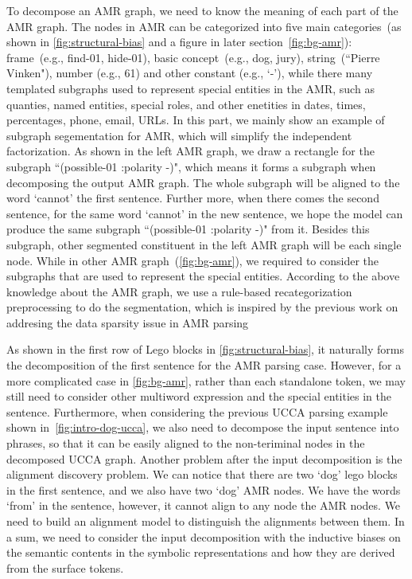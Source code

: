 { To decompose an AMR graph, we need to
know the meaning of each part of the AMR graph. The nodes in AMR can
be categorized into five main categories~(as shown in
\autoref{fig:structural-bias} and a figure in later
section~\autoref{fig:bg-amr}): frame~(e.g., find-01, hide-01), basic
concept~(e.g., dog, jury), string~(``Pierre Vinken"), number (e.g.,
61) and other constant (e.g., `-'), while there many templated
subgraphs used to represent special entities in the AMR, such as
quanties, named entities, special roles, and other enetities in dates,
times, percentages, phone, email, URLs. In this part, we mainly show
an example of subgraph segementation for AMR, which will simplify the
independent factorization. As shown in the left AMR graph, we draw a
rectangle for the subgraph ``(possible-01 :polarity -)", which means
it forms a subgraph when decomposing the output AMR graph. The whole
subgraph will be aligned to the word `cannot' the first
sentence. Further more, when there comes the second sentence, for the
same word `cannot' in the new sentence, we hope the model can produce
the same subgraph ``(possible-01 :polarity -)" from it. Besides this
subgraph, other segmented constituent in the left AMR graph will be
each single node. While in other AMR graph~(\autoref{fig:bg-amr}), we
required to consider the subgraphs that are used to represent the
special entities. According to the above knowledge about the AMR
graph, we use a rule-based recategorization preprocessing to do the
segmentation, which is inspired by the previous work on addresing the
data sparsity issue in AMR
parsing~\cite{Werling:2015up,foland-martin-2017-abstract,Wang:2017vt,Peng:2017ud
}

 As shown in
the first row of Lego blocks in \autoref{fig:structural-bias}, it
naturally forms the decomposition of the first sentence for the AMR
parsing case. However, for a more complicated case in
\autoref{fig:bg-amr}, rather than each standalone token, we may still
need to consider other multiword expression and the special entities
in the sentence. Furthermore, when considering the previous UCCA
parsing example shown in~\autoref{fig:intro-dog-ucca}, we also need to
decompose the input sentence into phrases, so that it can be easily
aligned to the non-teriminal nodes in the decomposed UCCA graph.
Another problem after the input decomposition is the alignment
discovery problem. We can notice that there are two `dog' lego blocks
in the first sentence, and we also have two `dog' AMR nodes. We have
the words `from' in the sentence, however, it cannot align to any node
the AMR nodes. We need to build an alignment model to distinguish the
alignments between them.  In a sum, we need to consider the input
decomposition with the inductive biases on the semantic contents in
the symbolic representations and how they are derived from the surface
tokens.

}
